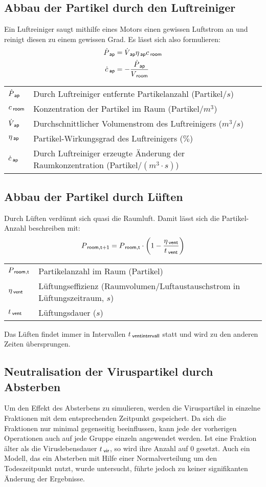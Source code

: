 \documentclass[12pt,a4paper,bibtotocnumbered,liststotocnumbered]{scrreprt}
\begin{document}
\subsection{Abbau der Partikel durch den Luftreiniger}
Ein Luftreiniger saugt mithilfe eines Motors einen gewissen Luftstrom an und reinigt diesen zu einem gewissen Grad. Es lässt sich also formulieren:
\begin{align}
\dot{P}_{\: \mathsf{ap}} &=\dot{V}_{\: \mathsf{ap}} \eta_{\: \mathsf{ap}} c_{\: \mathsf{room}}\\
\dot{c}_{\: \mathsf{ap}} &=-\frac{\dot{P}_{\: \mathsf{ap}}}{V_{\: \mathsf{room}}}
\end{align}
\begin{tabular}{ll}
$\dot{P}_{\: \mathsf{ap}}$ & Durch Luftreiniger entfernte Partikelanzahl (Partikel$/s$)\\
$c_{\: \mathsf{room}}$ & Konzentration der Partikel im Raum (Partikel$/m^3$)\\
$\dot{V}_{\: \mathsf{ap}}$ & Durchschnittlicher Volumenstrom des Luftreinigers ($m^3/s$)\\
$\eta_{\: \mathsf{ap}}$ & Partikel-Wirkungsgrad des Luftreinigers ($\%$)\\
$\dot{c}_{\: \mathsf{ap}}$ & Durch Luftreiniger erzeugte Änderung der  Raumkonzentration (Partikel$/(m^3\cdot s)$)\\
\end{tabular}

\subsection{Abbau der Partikel durch Lüften}
Durch Lüften verdünnt sich quasi die Raumluft. Damit lässt sich die Partikel-Anzahl beschreiben mit:
\begin{align}
P_{\: \mathsf{room,t+1}} = P_{\: \mathsf{room,t}} \cdot \left( 1 -  \frac{\eta_{\: \mathsf{vent}}}{t_{\: \mathsf{vent}}}\right)
\end{align}
\begin{tabular}{ll}
$P_{\: \mathsf{room,t}} $ & Partikelanzahl im Raum (Partikel)\\
$\eta_{\: \mathsf{vent}}$ & Lüftungseffizienz (Raumvolumen/Luftaustauschstrom in Lüftungszeitraum, $s$)\\
$t_{\: \mathsf{vent}} $ & Lüftungsdauer ($s$)\\
\end{tabular}
Das Lüften findet immer in Intervallen $t_{\: \mathsf{ventintervall}} $ statt und wird zu den anderen Zeiten übersprungen.

\subsection{Neutralisation der Viruspartikel durch Absterben}
Um den Effekt des Absterbens zu simulieren, werden die Viruspartikel in einzelne Fraktionen mit dem entsprechenden Zeitpunkt gespeichert. Da sich die Fraktionen nur minimal gegenseitig beeinflussen, kann jede der vorherigen Operationen auch auf jede Gruppe einzeln angewendet werden. Ist eine Fraktion älter als die Viruslebensdauer $t_{\: \mathsf{vir}}$, so wird ihre Anzahl auf 0 gesetzt. Auch ein Modell, das ein Absterben mit Hilfe einer Normalverteilung um den Todeszeitpunkt nutzt, wurde untersucht, führte jedoch zu keiner signifikanten Änderung der Ergebnisse. 
\end{document}
